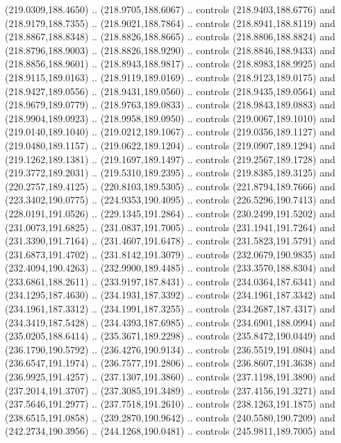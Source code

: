 \begin{scope}[cm={{1.25,0.0,0.0,-1.25,(0.0,442.91375)}}]
    (219.0309,188.4650) .. (218.9705,188.6067) .. controls (218.9403,188.6776) and
    (218.9179,188.7355) .. (218.9021,188.7864) .. controls (218.8941,188.8119) and
    (218.8867,188.8348) .. (218.8826,188.8665) .. controls (218.8806,188.8824) and
    (218.8796,188.9003) .. (218.8826,188.9290) .. controls (218.8846,188.9433) and
    (218.8856,188.9601) .. (218.8943,188.9817) .. controls (218.8983,188.9925) and
    (218.9115,189.0163) .. (218.9119,189.0169) .. controls (218.9123,189.0175) and
    (218.9427,189.0556) .. (218.9431,189.0560) .. controls (218.9435,189.0564) and
    (218.9679,189.0779) .. (218.9763,189.0833) .. controls (218.9843,189.0883) and
    (218.9904,189.0923) .. (218.9958,189.0950) .. controls (219.0067,189.1010) and
    (219.0140,189.1040) .. (219.0212,189.1067) .. controls (219.0356,189.1127) and
    (219.0480,189.1157) .. (219.0622,189.1204) .. controls (219.0907,189.1294) and
    (219.1262,189.1381) .. (219.1697,189.1497) .. controls (219.2567,189.1728) and
    (219.3772,189.2031) .. (219.5310,189.2395) .. controls (219.8385,189.3125) and
    (220.2757,189.4125) .. (220.8103,189.5305) .. controls (221.8794,189.7666) and
    (223.3402,190.0775) .. (224.9353,190.4095) .. controls (226.5296,190.7413) and
    (228.0191,191.0526) .. (229.1345,191.2864) .. controls (230.2499,191.5202) and
    (231.0073,191.6825) .. (231.0837,191.7005) .. controls (231.1941,191.7264) and
    (231.3390,191.7164) .. (231.4607,191.6478) .. controls (231.5823,191.5791) and
    (231.6873,191.4702) .. (231.8142,191.3079) .. controls (232.0679,190.9835) and
    (232.4094,190.4263) .. (232.9900,189.4485) .. controls (233.3570,188.8304) and
    (233.6861,188.2611) .. (233.9197,187.8431) .. controls (234.0364,187.6341) and
    (234.1295,187.4630) .. (234.1931,187.3392) .. controls (234.1961,187.3342) and
    (234.1961,187.3312) .. (234.1991,187.3255) .. controls (234.2687,187.4317) and
    (234.3419,187.5428) .. (234.4393,187.6985) .. controls (234.6901,188.0994) and
    (235.0205,188.6414) .. (235.3671,189.2298) .. controls (235.8472,190.0449) and
    (236.1790,190.5792) .. (236.4276,190.9134) .. controls (236.5519,191.0804) and
    (236.6547,191.1974) .. (236.7577,191.2806) .. controls (236.8607,191.3638) and
    (236.9925,191.4257) .. (237.1307,191.3860) .. controls (237.1198,191.3890) and
    (237.2014,191.3707) .. (237.3085,191.3489) .. controls (237.4156,191.3271) and
    (237.5646,191.2977) .. (237.7518,191.2610) .. controls (238.1263,191.1875) and
    (238.6515,191.0858) .. (239.2870,190.9642) .. controls (240.5580,190.7209) and
    (242.2734,190.3956) .. (244.1268,190.0481) .. controls (245.9811,189.7005) and

\end{scope}
